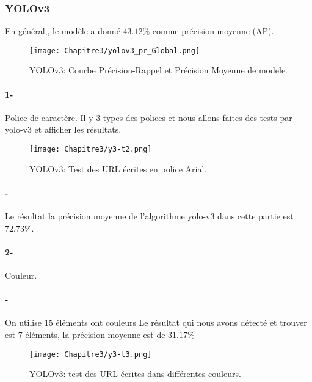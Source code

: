           \subsubsection{YOLOv3}
          En général,, le modèle a donné $43.12\%$ comme précision moyenne (AP). 
           \begin{figure}[H]
                    \centering
                     \texttt{[image: Chapitre3/yolov3\_pr\_Global.png]}
                     \caption{YOLOv3: Courbe Précision-Rappel et Précision Moyenne de modele.}
                     \label{y3_t0}
                     \end{figure}

           \paragraph{1-} Police de caractère.
              Il y  3 types des polices  et nous allons faites des tests par yolo-v3 et afficher les résultats.
           \begin{figure}[H]
                   \centering
                    \texttt{[image: Chapitre3/y3-t2.png]}
                    \caption{YOLOv3: Test des URL écrites en police Arial.}
                    \label{y3_t1}
                    \end{figure}
               
           \paragraph{-}Le résultat 
           la précision moyenne de l'algorithme yolo-v3 dans cette partie est $72.73\%$.

           \paragraph{2-} Couleur.
           \paragraph{-}  On utilise 15 éléments ont couleurs
            Le résultat qui nous avons détecté et trouver est 7 éléments,  la précision moyenne est de $31.17\%$
           \begin{figure}[H]
               \centering
                \texttt{[image: Chapitre3/y3-t3.png]}
                \caption{YOLOv3: test des URL écrites dans différentes couleurs.}
                \label{y3_t3}
                \end{figure}
           
